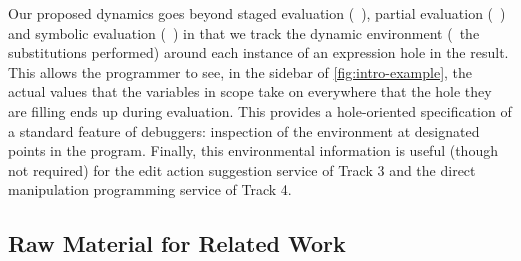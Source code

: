 Our proposed dynamics goes beyond staged evaluation (\eg{}~\cite{Taha:1999}), partial evaluation (\eg{}~\cite{Jones:1993uq}) and symbolic evaluation (\eg{}~\cite{King:1976}) in that we track the dynamic environment (\ie{}~the substitutions performed) around each instance of an expression hole in the result. This allows the programmer to see, in the sidebar of \autoref{fig:intro-example}, the actual values that the variables in scope take on everywhere that the hole they are filling ends up during evaluation. This provides a hole-oriented specification of a standard feature of debuggers: inspection of the environment at designated points in the program. Finally, this environmental information is useful (though not required) for the edit action suggestion service of Track 3 and the direct manipulation programming service of Track 4. 

\subsection{Raw Material for Related Work}

